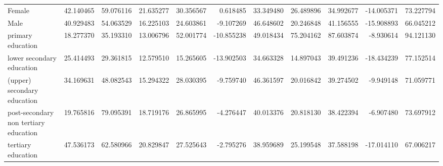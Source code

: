 \documentclass[11pt]{article}
\begin{document}
\begin{table}[!htbp]
{\begin{tabular}{lrrrrrrrrrr}
Female                                &  42.140465 &  59.076116 &  21.635277 &  30.356567 &   0.618485 &  33.349480 &  26.489896 &  34.992677 &  -14.005371 &   73.227794 \\
Male                                  &  40.929483 &  54.063529 &  16.225103 &  24.603861 &  -9.107269 &  46.648602 &  20.246848 &  41.156555 &  -15.908893 &   66.045212 \\
primary education                     &  18.277370 &  35.193310 &  13.006796 &  52.001774 & -10.855238 &  49.018434 &  75.204162 &  87.603874 &   -8.930614 &   94.121130 \\
lower secondary education             &  25.414493 &  29.361815 &  12.579510 &  15.265605 & -13.902503 &  34.663328 &  14.897043 &  39.491236 &  -18.434239 &   77.152514 \\
(upper) secondary education           &  34.169631 &  48.082543 &  15.294322 &  28.030395 &  -9.759740 &  46.361597 &  20.016842 &  39.274502 &   -9.949148 &   71.059771 \\
post-secondary non tertiary education &  19.765816 &  79.095391 &  18.719176 &  26.865995 &  -4.276447 &  40.013376 &  20.818130 &  38.422394 &   -6.907480 &   73.697912 \\
tertiary education                    &  47.536173 &  62.580966 &  20.829847 &  27.525643 &  -2.795276 &  38.959689 &  25.199548 &  37.588198 &  -17.014110 &   67.006217 \\
\bottomrule
\end{tabular}
}
\end{table}
\end{document}
